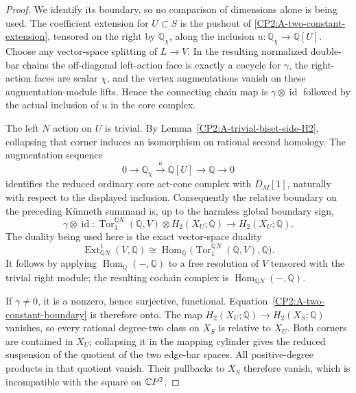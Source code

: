 \begin{proof}
We identify its boundary, so no comparison of dimensions alone
is being used. The coefficient extension for $U\subset S$ is
the pushout of \eqref{CP2:A-two-constant-extension}, tensored
on the right by $\mathbb Q_\chi$, along the inclusion
$u:\mathbb Q_\chi\to\mathbb Q[U]$.
Choose any vector-space splitting of $L\to V$. In the resulting
normalized double-bar chains the off-diagonal left-action face
is exactly a cocycle for $\gamma$, the right-action faces are
scalar $\chi$, and the vertex augmentations vanish on these
augmentation-module lifts. Hence the connecting chain map is
$\gamma\otimes\operatorname{id}$ followed by the actual
inclusion of $u$ in the core complex.

The left $N$ action on $U$ is trivial. By
Lemma~\ref{CP2:A-trivial-biset-side-H2}, collapsing that corner
induces an isomorphism on rational second homology. The
augmentation sequence
\[
0\longrightarrow\mathbb Q_\chi\xrightarrow{\,u\,}
\mathbb Q[U]\longrightarrow\mathbb Q\longrightarrow0
\]
identifies the reduced ordinary core act-cone complex with
$D_M[1]$, naturally with respect to the displayed inclusion.
Consequently the relative boundary on the preceding K\"unneth
summand is, up to the harmless global boundary sign,
\begin{equation}\label{CP2:A-two-constant-boundary}
\gamma\otimes\operatorname{id}:
\operatorname{Tor}^{\mathbb QN}_1(\mathbb Q,V)
\otimes H_2(X_U;\mathbb Q)
\longrightarrow H_2(X_U;\mathbb Q).
\end{equation}
The duality being used here is the exact vector-space duality
\[
\operatorname{Ext}^1_{\mathbb QN}(V,\mathbb Q)
\cong
\operatorname{Hom}_{\mathbb Q}
\bigl(\operatorname{Tor}^{\mathbb QN}_1(\mathbb Q,V),\mathbb Q\bigr).
\]
It follows by applying $\operatorname{Hom}_{\mathbb Q}(-,\mathbb Q)$
to a free resolution of $V$ tensored with the trivial right
module; the resulting cochain complex is
$\operatorname{Hom}_{\mathbb QN}(-,\mathbb Q)$.

If $\gamma\ne0$, it is a nonzero, hence surjective, functional.
Equation~\eqref{CP2:A-two-constant-boundary} is therefore onto.
The map $H_2(X_U;\mathbb Q)\to H_2(X_S;\mathbb Q)$ vanishes,
so every rational degree-two class on $X_S$ is relative to $X_U$.
Both corners are contained in $X_U$; collapsing it in the
mapping cylinder gives the reduced suspension of the quotient
of the two edge-bar spaces. All positive-degree products in
that quotient vanish. Their pullbacks to $X_S$ therefore vanish,
which is incompatible with the square on $\mathbb{C}P^2$.


\end{proof}
